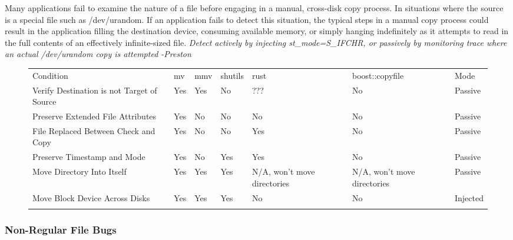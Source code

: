        Many applications fail to examine the nature of a file before engaging in a manual, cross-disk copy process.  In
        situations where the source is a special file such as /dev/urandom.  If an application fails to detect this
        situation, the typical steps in a manual copy process could result in the application filling the destination
        device, consuming available memory, or simply hanging indefinitely as it attempts to read in the full contents
        of an effectively infinite-sized file. \emph{Detect actively by injecting st_mode=S_IFCHR, or passively by
          monitoring trace where an actual /dev/urandom copy is attempted -Preston}

\begin{figure*}[t]
                \scriptsize{}
                \begin{tabular}{l l l l l l | l}
                \toprule{}
                  Condition & mv & mmv & shutils & rust & boost::copyfile & Mode\\
                  Verify Destination is not Target of Source & Yes & Yes & No & ??? & No & Passive\\
                  Preserve Extended File Attributes & Yes & No & No & No & No & Passive\\
                  File Replaced Between Check and Copy & Yes & No & No & Yes & No & Passive\\
                  Preserve Timestamp and Mode & Yes & No & Yes & Yes & No & Passive\\
                  Move Directory Into Itself & Yes & Yes & Yes & N/A, won't move directories & N/A, won't move directories & Passive\\
                  Move Block Device Across Disks & Yes & Yes & Yes & No & No & Injected\\
                \bottomrule{}
                \end{tabular}
\end{figure*}

        \subsubsection{Non-Regular File Bugs}

